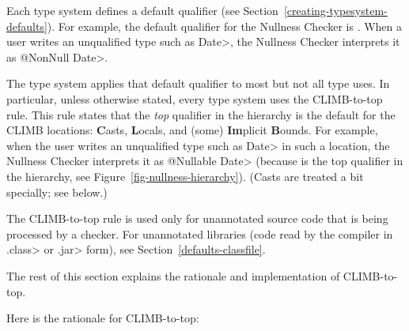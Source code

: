 
Each type system defines a default qualifier (see
Section~\ref{creating-typesystem-defaults}).  For example, the default
qualifier for the Nullness Checker is
.  When a user
writes an unqualified type such as \<Date>, the Nullness Checker interprets it as
\<@NonNull Date>.

The type system applies that default qualifier to most but
not all type uses.  In particular, unless otherwise stated, every type system
uses the CLIMB-to-top rule.  This
rule states that the \emph{top} qualifier in the hierarchy is the default for
the CLIMB locations:  \textbf{C}asts, \textbf{L}ocals,
and (some) \textbf{Im}plicit \textbf{B}ounds.
For example, when the user writes an unqualified type such as \<Date> in such a
location, the Nullness Checker interprets it as \<@Nullable Date> (because
 is the top qualifier in the
hierarchy, see Figure~\ref{fig-nullness-hierarchy}).
(Casts are treated a bit specially; see below.)


The CLIMB-to-top rule is used only for unannotated source code that is
being processed by a checker.  For unannotated libraries (code read by the
compiler in \<.class> or \<.jar> form), see Section~\ref{defaults-classfile}.

The rest of this section explains the rationale and implementation of
CLIMB-to-top.

Here is the rationale for CLIMB-to-top:

